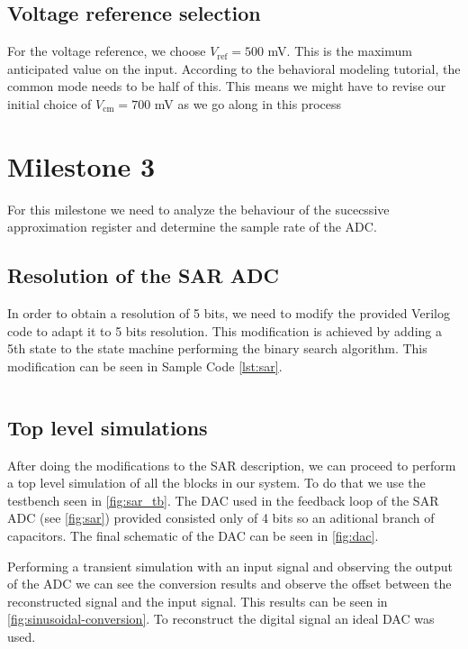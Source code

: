 \documentclass{article}
\newcommand*{\subb}[1]{\ensuremath{_{\mathrm{#1}}}}
\begin{document}
 \subsection{Voltage reference selection}
 For the voltage reference, we choose $V\subb{ref}=500$ mV. This is the maximum anticipated value on the input. According to the behavioral modeling tutorial, the common mode needs to be half of this. This means we might have to revise our initial choice of $V\subb{cm}=700$ mV as we go along in this process
 \section*{Milestone 3}
 \setcounter{section}{3}
 \setcounter{subsection}{0}
 For this milestone we need to analyze the behaviour of the sucecssive approximation register and determine the sample rate of the ADC.
 \subsection{Resolution of the SAR ADC}
 In order to obtain a resolution of 5 bits, we need to modify the provided Verilog code to adapt it to 5 bits resolution. This modification is achieved by adding a 5th state to the state machine performing the binary search algorithm. This modification can be seen in Sample Code \ref{lst:sar}.
 
  \inputminted{verilog}{../IL2239_SAR_ADC/SAR4/functional/verilog.v}
 
 \subsection{Top level simulations}
 After doing the modifications to the SAR description, we can proceed to perform a top level simulation of all the blocks in our system. To do that we use the testbench seen in \autoref{fig:sar_tb}.  The DAC used in the feedback loop of the SAR ADC (see \autoref{fig:sar}) provided consisted only of 4 bits so an aditional branch of capacitors. The final schematic of the DAC can be seen in \autoref{fig:dac}.\bigskip

 Performing a transient simulation with an input signal and observing the output of the ADC we can see the conversion results and observe the offset between the reconstructed signal and the input signal. This results can be seen in \autoref{fig:sinusoidal-conversion}. To reconstruct the digital signal an ideal DAC was used.
\end{document}
